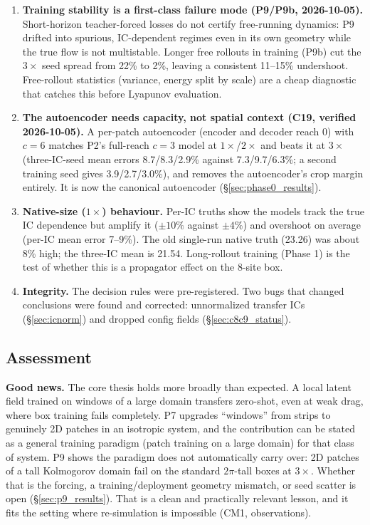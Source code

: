 \documentclass[11pt]{article}
\begin{document}
\begin{enumerate}[leftmargin=*]
  model cannot be expected to transfer.
\item \textbf{Training stability is a first-class failure mode
  (P9/P9b, 2026-10-05).} Short-horizon teacher-forced losses do not
  certify free-running dynamics: P9 drifted into spurious, IC-dependent
  regimes even in its own geometry while the true flow is not
  multistable. Longer free rollouts in training (P9b) cut the $3\times$
  seed spread from 22\% to 2\%, leaving a consistent 11--15\%
  undershoot. Free-rollout statistics (variance, energy split by scale)
  are a cheap diagnostic that catches this before Lyapunov evaluation.
\item \textbf{The autoencoder needs capacity, not spatial context
  (C19, verified 2026-10-05).} A per-patch autoencoder (encoder and
  decoder reach 0) with $c{=}6$ matches P2's full-reach $c{=}3$ model at
  $1\times$/$2\times$ and beats it at $3\times$ (three-IC-seed mean errors
  8.7/8.3/2.9\% against 7.3/9.7/6.3\%; a second training seed gives
  3.9/2.7/3.0\%), and removes the autoencoder's crop margin entirely. It
  is now the canonical autoencoder (\S\ref{sec:phase0_results}).
\item \textbf{Native-size ($1\times$) behaviour.} Per-IC truths show the
  models track the true IC dependence but amplify it ($\pm10\%$ against
  $\pm4\%$) and overshoot on average (per-IC mean error 7--9\%). The old
  single-run native truth (23.26) was about 8\% high; the three-IC mean
  is 21.54. Long-rollout training (Phase 1) is the test of whether this
  is a propagator effect on the 8-site box.
\item \textbf{Integrity.} The decision rules were pre-registered. Two
  bugs that changed conclusions were found and corrected: unnormalized
  transfer ICs (\S\ref{sec:icnorm}) and dropped config fields
  (\S\ref{sec:c8c9_status}).
\end{enumerate}

\subsection{Assessment}
\textbf{Good news.} The core thesis holds more broadly than expected. A
local latent field trained on windows of a large domain transfers
zero-shot, even at weak drag, where box training fails completely. P7
upgrades ``windows'' from strips to genuinely 2D patches in an isotropic
system, and the contribution can be stated as a general training
paradigm (patch training on a large domain) for that class of system.
P9 shows the paradigm does not automatically carry over: 2D patches of
a tall Kolmogorov domain fail on the standard $2\pi$-tall boxes at
$3\times$. Whether that is the forcing, a training/deployment geometry
mismatch, or seed scatter is open (\S\ref{sec:p9_results}). That
is a clean and practically relevant lesson, and it fits the setting
where re-simulation is impossible (CM1, observations).
\end{document}
